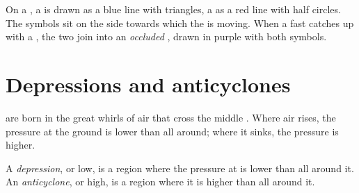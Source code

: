 On a  , a  is drawn as a blue line with triangles, a
 as a red line with half circles. The symbols sit on the side
towards which the  is moving. When a fast  catches up with
a , the two join into an \emph{occluded }, drawn in purple
with both symbols.

\section{Depressions and anticyclones}

 are born in the great whirls of air that cross the middle
. Where air rises, the pressure at the ground is lower than all
around; where it sinks, the pressure is higher.

\begin{definition}\label{def:g8:fronts-and-weather-maps:depression}
A \emph{depression}, or low, is a region where
the pressure at  is lower than all around it. An
\emph{anticyclone}, or high, is a region where it is
higher than all around it.
\end{definition}
\label{def:g8:fronts-and-weather-maps:anticyclone}

